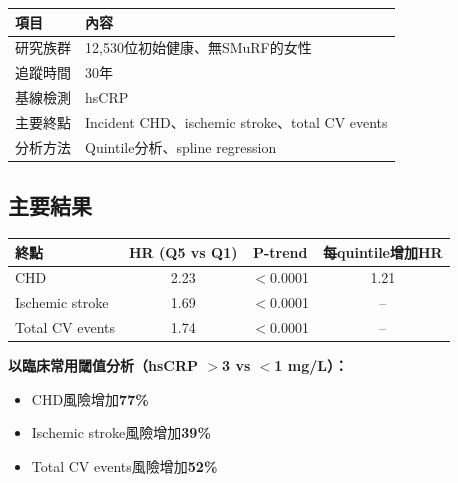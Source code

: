 \documentclass[12pt,a4paper]{article}
\begin{document}
\begin{longtable}{p{4cm}p{10cm}}
\toprule
\textbf{項目} & \textbf{內容} \\
\midrule
\endfirsthead
\bottomrule
\endfoot

研究族群 & 12,530位初始健康、無SMuRF的女性 \\
\midrule
追蹤時間 & 30年 \\
\midrule
基線檢測 & hsCRP \\
\midrule
主要終點 & Incident CHD、ischemic stroke、total CV events \\
\midrule
分析方法 & Quintile分析、spline regression \\
\bottomrule
\end{longtable}

\subsection{主要結果}


\begin{longtable}{p{5cm}ccc}
\toprule
\textbf{終點} & \textbf{HR (Q5 vs Q1)} & \textbf{P-trend} & \textbf{每quintile增加HR} \\
\midrule
\endfirsthead
\bottomrule
\endfoot

CHD & 2.23 & $<$0.0001 & 1.21 \\
Ischemic stroke & 1.69 & $<$0.0001 & -- \\
Total CV events & 1.74 & $<$0.0001 & -- \\
\bottomrule
\end{longtable}

\textbf{以臨床常用閾值分析（hsCRP $>$3 vs $<$1 mg/L）：}
\begin{itemize}
    \item CHD風險增加\textbf{77\%}
    \item Ischemic stroke風險增加\textbf{39\%}
    \item Total CV events風險增加\textbf{52\%}
\end{itemize}

\end{document}
